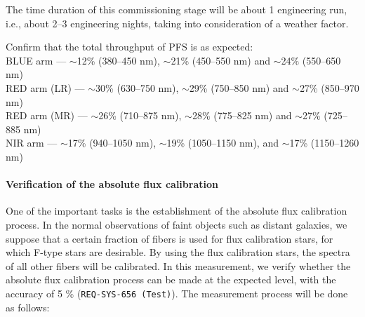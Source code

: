 The time duration of this commissioning stage will be about 1 engineering run, i.e., about 2--3 engineering nights, taking into consideration of a weather factor.

\begin{itembox}[l]{}
Confirm that the total throughput of PFS is as expected:\\
BLUE arm --- $\sim$12\% (380--450 nm), $\sim$21\% (450--550 nm) and $\sim$24\% (550--650 nm) \\
RED arm (LR) --- $\sim$30\% (630--750 nm), $\sim$29\% (750--850 nm) and $\sim$27\% (850--970 nm) \\
RED arm (MR) --- $\sim$26\% (710--875 nm), $\sim$28\% (775--825 nm) and $\sim$27\% (725--885 nm) \\
NIR arm --- $\sim$17\% (940--1050 nm), $\sim$19\% (1050--1150 nm), and $\sim$17\% (1150--1260 nm)
\end{itembox}

\paragraph{Verification of the absolute flux calibration}
One of the important tasks is the establishment of the absolute flux calibration process. In the normal observations of faint objects such as distant galaxies, we suppose that a certain fraction of fibers is used for flux calibration stars, for which F-type stars are desirable. By using the flux calibration stars, the spectra of all other fibers will be calibrated. In this measurement, we verify whether the absolute flux calibration process can be made at the expected level, with the accuracy of 5 \% ({\tt REQ-SYS-656 (Test)}). The measurement process will be done as follows:

